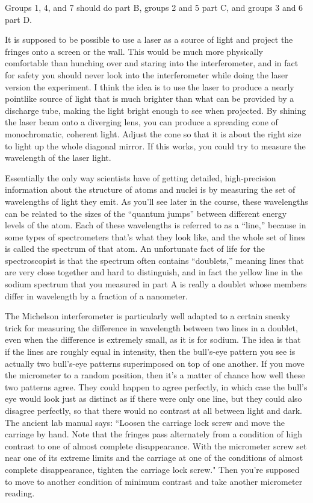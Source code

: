 Groups 1, 4, and 7 should do part B, groups 2 and 5 part C, and groups 3 and 6 part D.


It is supposed to be possible to use a laser as a source of light and project the fringes onto a screen
or the wall. This would be much more physically comfortable than hunching over and staring into the 
interferometer, and in fact for safety you should never look into the interferometer while doing
the laser version the experiment. I think the idea is to use the laser to produce a nearly
pointlike source of light that is much brighter than what can be provided by a discharge tube,
making the light bright enough to see when projected. By shining the laser beam onto a
diverging lens, you can produce a spreading cone of monochromatic, coherent light.
Adjust the cone so that it is about the right size to light up the whole diagonal mirror.
If this works, you could try to measure the wavelength of the laser light.


Essentially the only way scientists have of getting detailed, high-precision information
about the structure of atoms and nuclei is by measuring the set of wavelengths of light
they emit. As you'll see later in the course, these wavelengths can be related to the sizes
of the ``quantum jumps'' between different energy levels of the atom. Each of these wavelengths
is referred to as a ``line,'' because in some types of spectrometers that's what they look like,
and the whole set of lines is called the spectrum of that atom.
An unfortunate fact of life for the spectroscopist is that the spectrum often contains ``doublets,''
meaning lines that are very close together and hard to distinguish, and in fact the yellow line
in the sodium spectrum that you measured in part A is really a doublet whose members differ
in wavelength by a fraction of a nanometer.

The Michelson interferometer
is particularly well adapted to a certain sneaky trick for measuring the difference in wavelength
between two lines in a doublet, even when the difference is extremely small, as it is for
sodium. The idea is that if the lines are roughly equal in intensity, then the bull's-eye pattern
you see is actually two bull's-eye patterns superimposed on top of one another. If you move
the micrometer to a random position, then it's a matter of chance how well these two patterns
agree. They could happen to agree perfectly, in which case the bull's eye would look just as distinct
as if there were only one line, but they could also disagree perfectly, so that there would no
contrast at all between light and dark. The ancient lab manual says: 
            ``Loosen the carriage lock screw and move the carriage by hand. Note that the fringes
            pass alternately from a condition of high contrast to one of almost complete
            disappearance. With the micrometer screw set near one of its extreme limits
            and the carriage at one of the conditions of almost complete disappearance,
            tighten the carriage lock screw." 
Then you're supposed to move to another condition of minimum
            contrast and take another micrometer reading.

